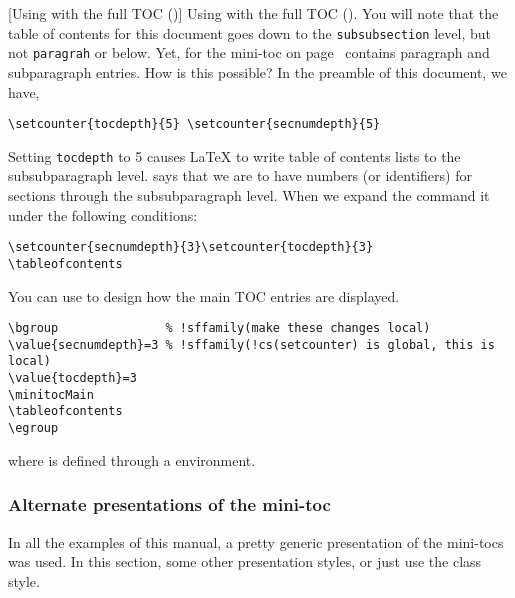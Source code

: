 \documentclass[10pt]{article}
\makeatletter
\renewcommand*{\theparagraph}{\texorpdfstring{\protect\P}{\textparagraph}}
\renewcommand{\paragraph}
    {\renewcommand{\@seccntformat}[1]{\theparagraph\space}%
    \@startsection{paragraph}{4}{0pt}{6pt}{-3pt}{\bfseries}}
\edef\amtIndent{\the\parindent}
\makeatother
\begin{document}
\paragraph[Using \texorpdfstring{{\protect{}} with the full TOC ({\protect{}})}
  {Using minitocfmt with the full TOC (\textbackslash{tableofcontents})}]%
  {Using  with the full TOC ().}\label{para:toc} You will note that
  the table of contents for this document goes down to the
  \texttt{subsubsection} level, but not \texttt{paragrah} or below. Yet,
  for the mini-toc on page~\pageref{SExmpls} contains paragraph and
  subparagraph entries. How is this possible? In the preamble of this document,
  we have,
\begin{Verbatim}[xleftmargin=\amtIndent,fontsize=\small]
\setcounter{tocdepth}{5} \setcounter{secnumdepth}{5}
\end{Verbatim}
Setting \texttt{tocdepth} to 5 causes {\LaTeX} to write table of contents lists to the subsubparagraph
level.  says that we are to have numbers (or identifiers)
for sections through the subsubparagraph level. When we expand the command  it under
the following conditions:
\begin{Verbatim}[xleftmargin=\amtIndent,fontsize=\small]
\setcounter{secnumdepth}{3}\setcounter{tocdepth}{3}
\tableofcontents
\end{Verbatim}
You can use  to design how the main TOC entries are displayed.
\begin{Verbatim}[xleftmargin=\amtIndent,fontsize=\small,commandchars=!()]
\bgroup               % !sffamily(make these changes local)
\value{secnumdepth}=3 % !sffamily(!cs(setcounter) is global, this is local)
\value{tocdepth}=3
\minitocMain
\tableofcontents
\egroup
\end{Verbatim}
where  is defined through a  environment.


\subsubsection{Alternate presentations of the mini-toc}\label{ss:AltPresent}

In all the examples of this manual, a pretty generic presentation of the
mini-tocs was used. In this section, some other presentation styles, or
just use the class style.
\end{document}
